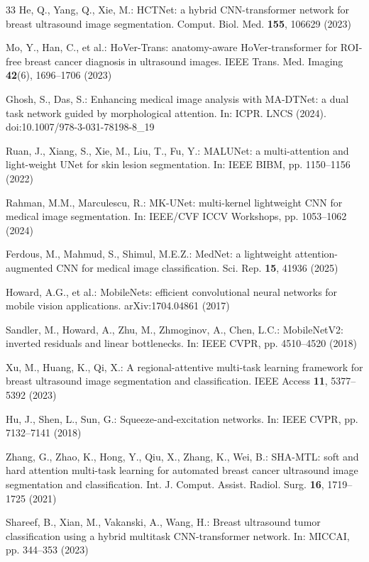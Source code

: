 \documentclass[runningheads]{llncs}
\begin{document}
\begin{thebibliography}{33}
He, Q., Yang, Q., Xie, M.: HCTNet: a hybrid CNN-transformer network for breast ultrasound image segmentation. Comput. Biol. Med. \textbf{155}, 106629 (2023)

Mo, Y., Han, C., et al.: HoVer-Trans: anatomy-aware HoVer-transformer for ROI-free breast cancer diagnosis in ultrasound images. IEEE Trans. Med. Imaging \textbf{42}(6), 1696--1706 (2023)

Ghosh, S., Das, S.: Enhancing medical image analysis with MA-DTNet: a dual task network guided by morphological attention. In: ICPR. LNCS (2024). doi:10.1007/978-3-031-78198-8\_19

Ruan, J., Xiang, S., Xie, M., Liu, T., Fu, Y.: MALUNet: a multi-attention and light-weight UNet for skin lesion segmentation. In: IEEE BIBM, pp. 1150--1156 (2022)

Rahman, M.M., Marculescu, R.: MK-UNet: multi-kernel lightweight CNN for medical image segmentation. In: IEEE/CVF ICCV Workshops, pp. 1053--1062 (2024)

Ferdous, M., Mahmud, S., Shimul, M.E.Z.: MedNet: a lightweight attention-augmented CNN for medical image classification. Sci. Rep. \textbf{15}, 41936 (2025)

Howard, A.G., et al.: MobileNets: efficient convolutional neural networks for mobile vision applications. arXiv:1704.04861 (2017)

Sandler, M., Howard, A., Zhu, M., Zhmoginov, A., Chen, L.C.: MobileNetV2: inverted residuals and linear bottlenecks. In: IEEE CVPR, pp. 4510--4520 (2018)

Xu, M., Huang, K., Qi, X.: A regional-attentive multi-task learning framework for breast ultrasound image segmentation and classification. IEEE Access \textbf{11}, 5377--5392 (2023)

Hu, J., Shen, L., Sun, G.: Squeeze-and-excitation networks. In: IEEE CVPR, pp. 7132--7141 (2018)

Zhang, G., Zhao, K., Hong, Y., Qiu, X., Zhang, K., Wei, B.: SHA-MTL: soft and hard attention multi-task learning for automated breast cancer ultrasound image segmentation and classification. Int. J. Comput. Assist. Radiol. Surg. \textbf{16}, 1719--1725 (2021)

Shareef, B., Xian, M., Vakanski, A., Wang, H.: Breast ultrasound tumor classification using a hybrid multitask CNN-transformer network. In: MICCAI, pp. 344--353 (2023)


\end{thebibliography}
\end{document}
